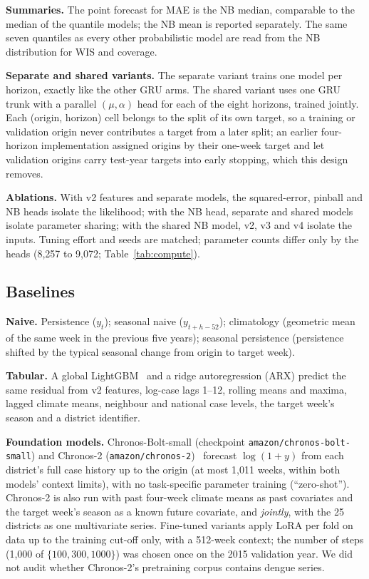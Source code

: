 \textbf{Summaries.} The point forecast for MAE is the NB median, comparable to the median of the quantile models; the NB mean is reported separately. The same seven quantiles as every other probabilistic model are read from the NB distribution for WIS and coverage.

\textbf{Separate and shared variants.} The separate variant trains one model per horizon, exactly like the other GRU arms. The shared variant uses one GRU trunk with a parallel $(\mu,\alpha)$ head for each of the eight horizons, trained jointly. Each (origin, horizon) cell belongs to the split of its own target, so a training or validation origin never contributes a target from a later split; an earlier four-horizon implementation assigned origins by their one-week target and let validation origins carry test-year targets into early stopping, which this design removes.

\textbf{Ablations.} With v2 features and separate models, the squared-error, pinball and NB heads isolate the likelihood; with the NB head, separate and shared models isolate parameter sharing; with the shared NB model, v2, v3 and v4 isolate the inputs. Tuning effort and seeds are matched; parameter counts differ only by the heads (8{,}257 to 9{,}072; Table~\ref{tab:compute}).

\subsection{Baselines}
\textbf{Naive.} Persistence ($y_t$); seasonal naive ($y_{t+h-52}$); climatology (geometric mean of the same week in the previous five years); seasonal persistence (persistence shifted by the typical seasonal change from origin to target week).

\textbf{Tabular.} A global LightGBM~\cite{ke2017lightgbm} and a ridge autoregression (ARX) predict the same residual from v2 features, log-case lags 1--12, rolling means and maxima, lagged climate means, neighbour and national case levels, the target week's season and a district identifier.

\textbf{Foundation models.} Chronos-Bolt-small (checkpoint \texttt{amazon/chronos-bolt-small}) and Chronos-2 (\texttt{amazon/chronos-2})~\cite{ansari2024chronos,chronosbolt2024card,ansari2025chronos2} forecast $\log(1+y)$ from each district's full case history up to the origin (at most 1{,}011 weeks, within both models' context limits), with no task-specific parameter training (``zero-shot''). Chronos-2 is also run with past four-week climate means as past covariates and the target week's season as a known future covariate, and \emph{jointly}, with the 25 districts as one multivariate series. Fine-tuned variants apply LoRA per fold on data up to the training cut-off only, with a 512-week context; the number of steps (1{,}000 of $\{100,300,1000\}$) was chosen once on the 2015 validation year. We did not audit whether Chronos-2's pretraining corpus contains dengue series.

